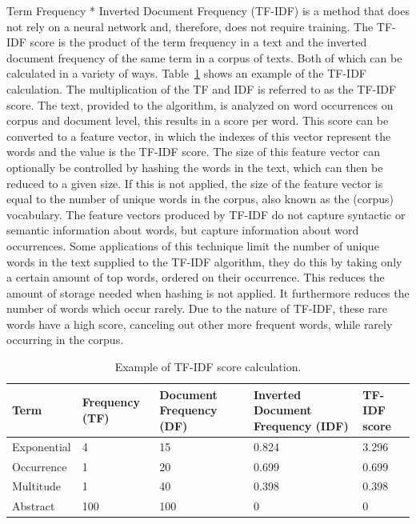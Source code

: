 \documentclass[../../Thesis.tex]{subfiles}
\begin{document}
\begin{jumpin}
Term Frequency * Inverted Document Frequency (TF-IDF) is a method that does not rely on a neural network and, therefore, does not require training. The TF-IDF score is the product of the term frequency in a text and the inverted document frequency of the same term in a corpus of texts. Both of which can be calculated in a variety of ways. Table~\ref{table:TFIDFScore} shows an example of the TF-IDF calculation. The multiplication of the TF and IDF is referred to as the TF-IDF score. The text, provided to the algorithm, is analyzed on word occurrences on corpus and document level, this results in a score per word. This score can be converted to a feature vector, in which the indexes of this vector represent the words and the value is the TF-IDF score. The size of this feature vector can optionally be controlled by hashing the words in the text, which can then be reduced to a given size. If this is not applied, the size of the feature vector is equal to the number of unique words in the corpus, also known as the (corpus) vocabulary.  The feature vectors produced by TF-IDF do not capture syntactic or semantic information about words, but capture information about word occurrences. Some applications of this technique limit the number of unique words in the text supplied to the TF-IDF algorithm, they do this by taking only a certain amount of top words, ordered on their occurrence. This reduces the amount of storage needed when hashing is not applied. It furthermore reduces the number of words which occur rarely. Due to the nature of TF-IDF, these rare words have a high score, canceling out other more frequent words, while rarely occurring in the corpus.
\vspace{0.3in}\begin{table}[hbt]
\begin{center}
\begin{tabular}{|p{1in}|p{1in}|p{1in}|p{1.3in}|p{1in}|}
\hline
Term & Frequency (TF) & Document Frequency (DF) & Inverted Document Frequency (IDF) & TF-IDF score\\
\hline
Exponential & 4 & 15 & 0.824 & 3.296\\
\hline
Occurrence & 1 & 20 & 0.699 & 0.699\\
\hline
Multitude & 1 & 40 & 0.398 & 0.398\\
\hline
Abstract & 100 & 100 & 0 & 0\\
\hline
\end{tabular}
\caption{Example of TF-IDF score calculation.}\label{table:TFIDFScore}
\end{center}
\end{table}
\FloatBarrier
\end{jumpin}
\end{document}
